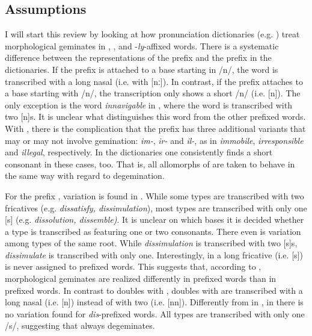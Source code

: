 \subsection{Assumptions } \label{assumption gem English}

I will start this review by looking at how pronunciation dictionaries (e.g. \citealt{Kenyon.1953, Roach.2011, Wells.2008}) treat  morphological geminates in , ,  and \hbox{-}\textit{ly}-affixed words.  There is a systematic difference between the representations of the prefix  and the prefix  in the dictionaries. If the prefix  is attached to a base starting in /n/, the word is transcribed with a long nasal (i.e. with [nː]). In contrast, if the prefix  attaches to a base starting with /n/, the transcription only shows a short /n/ (i.e. [n]). The only exception is the word \textit{innavigable} in \citet{Roach.2011}, where the word is transcribed with two [n]s. It is unclear what distinguishes this word from the other prefixed words. 
  With , there is the complication that the prefix has three additional variants that may or may not involve gemination: \textit{im-}, \textit{ir-} and \textit{il-}, as in \textit{immobile}, \textit{irresponsible} and \textit{illegal}, respectively. In the dictionaries one consistently finds a short consonant in these cases, too. That is, all allomorphs of  are taken to behave in the same way with regard to {degemination}.
  
 For the prefix , variation is found in \cite{Roach.2011}. While some types are transcribed with two fricatives (e.g. \textit{dissatisfy, dissimulation}), most types are transcribed with only one [s] (e.g. \textit{dissolution, dissemble)}. It is unclear on which bases it is decided whether a type is transcribed as featuring one or two consonants. There even is variation among types of the same root. While \textit{dissimulation} is transcribed with two [s]s, \textit{dissimulate} is transcribed with only one. Interestingly, in \cite{Roach.2011}  a long fricative (i.e. [s\textlengthmark]) is never assigned to prefixed words. This suggests that, according to \cite{Roach.2011},  morphological geminates are realized differently in prefixed words than in pre\-fixed words. In contrast to doubles with , doubles with  are transcribed with a long nasal (i.e. [n\textlengthmark])  instead of with two (i.e. [nn]).
 Differently from in \cite{Roach.2011}, in \cite{Wells.2008} there is no variation found for \textit{dis}-prefixed words. All types are transcribed with only one /s/, suggesting that  always {degeminates}. 
  
